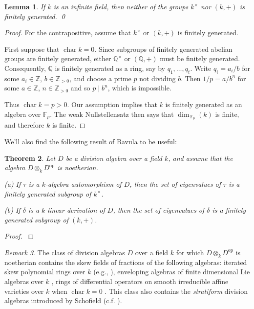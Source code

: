 \documentclass{conm-p-l}
\newtheorem{theorem}{Theorem}[section]
\newtheorem{lem}[theorem]{Lemma}
\theoremstyle{definition}
\theoremstyle{remark}
\newtheorem{rem}[theorem]{Remark}
\numberwithin{equation}{section}
\newcommand{\FF}{\mathbb{F}}
\newcommand{\QQ}{\mathbb{Q}}
\newcommand{\ZZ}{\mathbb{Z}}
\DeclareMathOperator{\ch}{char}
\newcommand \Zpos {\ZZ_{> 0}}
\newcommand{\kx}{k^\times}
\DeclareMathOperator{\op}{op}
\begin{document}
\begin{lem}  \label{kxk+.non.fingen}
If $k$ is an infinite field, then neither of the groups $\kx$ nor $(k,+)$ is finitely generated.
\qed\end{lem}

\begin{proof}
For the contrapositive, assume that $\kx$ or $(k,+)$ is finitely generated.

First suppose that $\ch k = 0$.  Since subgroups of finitely generated abelian groups are finitely generated, either $\QQ^\times$ or $(\QQ,+)$ must be finitely generated.  Consequently, $\QQ$ is finitely generated as a ring, say by $q_1,\dots,q_t$.  Write $q_i = a_i/b$ for some $a_i \in \ZZ$, $b \in \Zpos$, and choose a prime $p$ not dividing $b$.  Then $1/p = a/b^n$ for some $a \in \ZZ$, $n \in \Zpos$ and so $p \mid b^n$, which is impossible.

Thus $\ch k = p > 0$.  Our assumption implies that $k$ is finitely generated as an algebra over $\FF_p$.  The weak Nullstellensatz then says that $\dim_{\,\FF_p}(k)$ is finite, and therefore $k$ is finite.
\end{proof}

We'll also find the following result of Bavula to be useful: 

\begin{theorem}  \label{Bav.fin.gen.eigen}  \cite{Bav}
Let $D$ be a division algebra over a field $k$, and assume that the algebra $D\otimes_k D^{\op}$ is noetherian.

{\rm(a)} If $\tau$ is a $k$-algebra automorphism of $D$, then the set of eigenvalues of $\tau$ is a finitely generated subgroup of $\kx$.

{\rm(b)} If $\delta$ is a $k$-linear derivation of $D$, then the set of eigenvalues of $\delta$ is a finitely generated subgroup of $(k,+)$.
\end{theorem}

\begin{proof}
\cite[Theorem 1.1]{Bav}
\end{proof}

\begin{rem}  \label{some.DtensorDop.noeth}
The class of division algebras $D$ over a field $k$ for which $D\otimes_k D^{\op}$ is noetherian contains the skew fields of fractions of the following algebras:  iterated skew polynomial rings over $k$ (e.g., \cite[Theorem 17.25]{Goo-War}), enveloping algebras of finite dimensional Lie algebras over $k$ \cite[Corollary 2.5]{Bav}, rings of differential operators on smooth irreducible affine varieties over $k$ when $\ch k = 0$ \cite[Corollary 2.4]{Bav}.  This class also contains the \emph{stratiform} division algebras introduced by Schofield \cite{Scho} (c.f. \cite[Proposition 1.8]{Yek-Zha}).
\end{rem}
\end{document}
